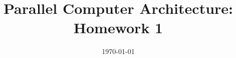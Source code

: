 \documentclass[10pt,epsf,a4paper,oneside,fleqn]{article}
\title{Parallel Computer Architecture: Homework 1}
\date{\today}
\begin{document}
\maketitle
\par


\end{document}
